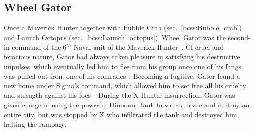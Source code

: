 \subsection{Wheel Gator}\label{boss:Wheel_gator}
Once a Maverick Hunter together with Bubble Crab (sec.~\ref{boss:Bubble_crab}) and Launch Octopus (sec.~\ref{boss:Launch_octopus}), Wheel Gator was the second-in-command  of the 6$^{th}$ Naval unit of the Maverick Hunter~\cite{Xcoll1:Manual_X2}. Of cruel and ferocious nature, Gator had always taken pleasure in satisfying his destructive impulses, which eventually led him to flee from his group once one of his fangs was pulled out from one of his comrades~\cite{wayback:X2_resources}. Becoming a fugitive, Gator found a new home under Sigma's command, which allowed him to set free all his cruelty and strength against his foes~\cite{wiki:Wheel_gator}. During the X-Hunter insurrection, Gator was given charge of using the powerful Dinosaur Tank to wreak havoc and destroy an entire city, but was stopped by X who infiltrated the tank and destroyed him, halting the rampage.


